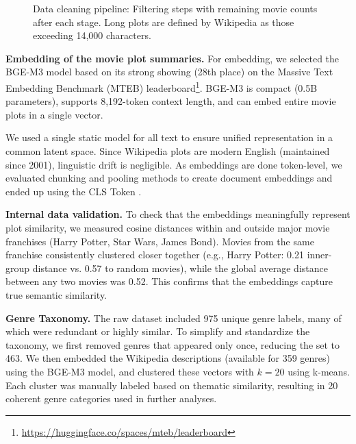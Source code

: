 \documentclass{article}
\begin{document}
\begin{figure}[ht]
\caption{Data cleaning pipeline: Filtering steps with remaining movie counts after each stage. Long plots are defined by Wikipedia as those exceeding 14,000 characters.}
\label{fig:data_cleaning_funnel}
\end{figure}

\textbf{Embedding of the movie plot summaries.} For embedding, we selected the BGE-M3 model \cite{chen2024bgem3embeddingmultilingualmultifunctionality} based on its strong showing (28th place) on the Massive Text Embedding Benchmark (MTEB) leaderboard\footnote{\url{https://huggingface.co/spaces/mteb/leaderboard}}. BGE-M3 is compact (0.5B parameters), supports 8,192-token context length, and can embed entire movie plots in a single vector.

We used a single static model for all text to ensure unified representation in a common latent space. Since Wikipedia plots are modern English (maintained since 2001), linguistic drift is negligible. As embeddings are done token-level, we evaluated chunking and pooling methods to create document embeddings \cite{DBLP:journals/corr/abs-1810-04805, pmlr-v97-gong19a, raffel2023exploringlimitstransferlearning} and ended up using the CLS Token \cite{our_github_repo}.

\textbf{Internal data validation.} To check that the embeddings meaningfully represent plot similarity, we measured cosine distances within and outside major movie franchises (Harry Potter, Star Wars, James Bond). Movies from the same franchise consistently clustered closer together (e.g., Harry Potter: 0.21 inner-group distance vs. 0.57 to random movies), while the global average distance between any two movies was 0.52. This confirms that the embeddings capture true semantic similarity.

\textbf{Genre Taxonomy.} The raw dataset included 975 unique genre labels, many of which were redundant or highly similar. To simplify and standardize the taxonomy, we first removed genres that appeared only once, reducing the set to 463. We then embedded the Wikipedia descriptions (available for 359 genres) using the BGE-M3 model, and clustered these vectors with $k=20$ using k-means. Each cluster was manually labeled based on thematic similarity, resulting in 20 coherent genre categories used in further analyses.
\end{document}
